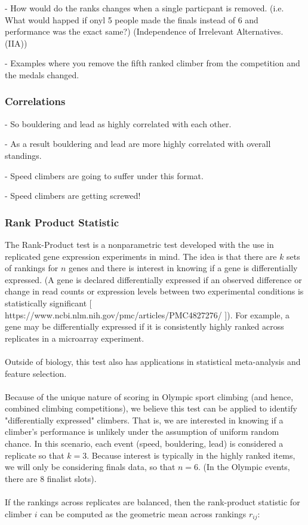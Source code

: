 \documentclass{article}\usepackage[]{graphicx}\usepackage[]{color}
\begin{document}
- How would do the ranks changes when a single particpant is removed.  (i.e. What would happed if onyl 5 people made the finals instead of 6 and performance was the exact same?) (Independence of Irrelevant Alternatives.  (IIA))

- Examples where you remove the fifth ranked climber from the competition and the medals changed. 

\subsubsection{Correlations}

- So bouldering and lead as highly correlated with each other. 

- As a result bouldering and lead are more highly correlated with overall standings.  

- Speed climbers are going to suffer under this format.  

- Speed climbers are getting screwed!

\subsubsection{Rank Product Statistic}

The Rank-Product test is a nonparametric test developed with the use in replicated gene expression experiments in mind. The idea is that there are $k$ sets of rankings for $n$ genes and there is interest in knowing if a gene is differentially expressed. (A gene is declared differentially expressed if an observed difference or change in read counts or expression levels between two experimental conditions is statistically significant [ https://www.ncbi.nlm.nih.gov/pmc/articles/PMC4827276/ ]). For example, a gene may be differentially expressed if it is consistently highly ranked across replicates in a microarray experiment.
\\
\\
Outside of biology, this test also has applications in statistical meta-analysis and feature selection.
\\
\\
Because of the unique nature of scoring in Olympic sport climbing (and hence, combined climbing competitions), we believe this test can be applied to identify "differentially expressed" climbers. That is, we are interested in knowing if a climber's performance is unlikely under the assumption of uniform random chance. In this scenario, each event (speed, bouldering, lead) is considered a replicate so that $k=3$. Because interest is typically in the highly ranked items, we will only be considering finals data, so that $n=6$. (In the Olympic events, there are 8 finalist slots).
\\
\\
If the rankings across replicates are balanced, then the rank-product statistic for climber $i$ can be computed as the geometric mean across rankings $r_{ij}$:
\end{document}

